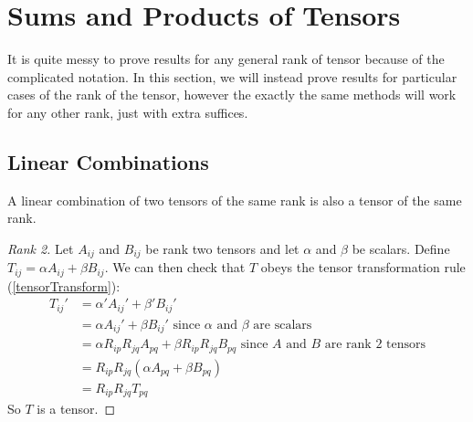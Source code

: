 \documentclass[../main.tex]{subfiles}
\begin{document}
\section{Sums and Products of Tensors}
\label{tensorSumsAndProducts}
\begin{remark}
  It is quite messy to prove results for any general rank of tensor because of the complicated notation.
  In this section, we will instead prove results for particular cases of the rank of the tensor, however the exactly the same methods will work for any other rank, just with extra suffices.
\end{remark}
\subsection{Linear Combinations}
\begin{lemma}
  A linear combination of two tensors of the same rank is also a tensor of the same rank.
\end{lemma}
\begin{proof}[Rank 2]
  Let $A_{i j}$ and $B_{i j}$ be rank two tensors and let $\alpha$ and $\beta$ be scalars.
  Define $T_{i j} = \alpha A_{i j} + \beta B_{i j}$.
  We can then check that $T$ obeys the tensor transformation rule (\cref{tensorTransform}):
  \begin{align*}
    T_{i j}' &= \alpha' A_{i j}' + \beta' B_{i j}' \\
             &= \alpha A_{i j}' + \beta B_{i j}' \text{ since $\alpha$ and $\beta$ are scalars} \\
             &= \alpha R_{i p} R_{j q} A_{p q} + \beta R_{i p}R_{j q}B_{p q} \text{ since $A$ and $B$ are rank 2 tensors}\\
             &= R_{i p}R_{j q}(\alpha A_{p q} + \beta B_{p q}) \\
             &= R_{i p}R_{j q}T_{p q}
  \end{align*}
  So $T$ is a tensor.
\end{proof}
\end{document}
